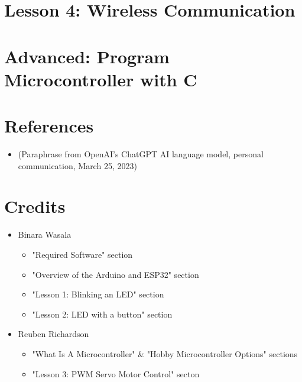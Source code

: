 \documentclass[a4paper,12pt]{report}
\begin{document}
\newpage

\section*{Lesson 4: Wireless Communication}

\section*{Advanced: Program Microcontroller with C}

    

\section*{References}

        \begin{itemize}
            \item (Paraphrase from OpenAI's ChatGPT AI language model, personal communication, March 25, 2023)
        \end{itemize}

\section{Credits}

        \begin{itemize}
            \item Binara Wasala
            \begin{itemize}
                \item "Required Software" section
                \item "Overview of the Arduino and ESP32" section
                \item "Lesson 1: Blinking an LED" section
                \item "Lesson 2: LED with a button" section
            \end{itemize}
            \item Reuben Richardson
            \begin{itemize}
                \item "What Is A Microcontroller" \& "Hobby Microcontroller Options" sections
                \item "Lesson 3: PWM Servo Motor Control" secton
            \end{itemize}
        \end{itemize}
\end{document}
